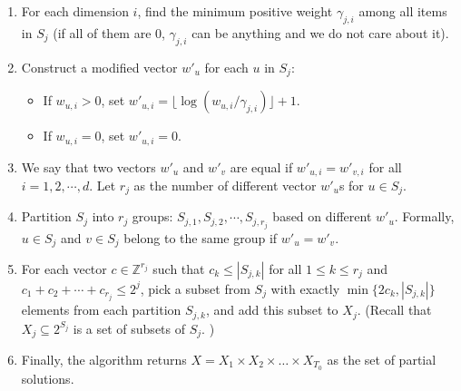\documentclass[11pt,a4paper]{article} \usepackage{enumitem}
\theoremstyle{definition}
\begin{document}
\begin{enumerate}
\item For each dimension \(i\), find the minimum positive weight \(\gamma_{j,i}\) among all items in \(S_j\) (if all of them are 0, \(\gamma_{j,i}\) can be anything and we do not care about it).

\item Construct a modified vector \(w'_u\) for each \(u\) in \(S_j\):
\begin{itemize}
    \item If \(w_{u,i} > 0\), set \(w'_{u,i} = \lfloor \log(w_{u,i}/\gamma_{j,i}) \rfloor + 1\).
    \item If \(w_{u,i} = 0\), set \(w'_{u,i} = 0\).
\end{itemize}

\item We say that two vectors \(w'_u\) and \(w'_v\) are equal if 
\(w'_{u,i} = w'_{v,i}\) for all \(i = 1, 2, \cdots, d\). 
Let \(r_j\) as the number of different vector \(w'_u\)s for $u\in S_j$.

\item Partition \(S_j\) into \(r_j\) groups: \(S_{j,1}, S_{j,2}, \cdots, S_{j,r_j}\) based on different \(w'_u\). Formally, 
$u\in S_j$ and $v\in S_j$ belong to the same group
if $w'_u = w'_v$.


\item For each vector \(c \in \mathbb{Z}^{r_j}\) such that \(c_k \le |S_{j,k}|\) for all \(1 \le k \le r_j\) and $c_1+c_2+\cdots+c_{r_j}\leq 2^j$, pick a subset from \(S_j\) with exactly \(\min \{2c_k, |S_{j,k}|\}\) elements from each partition \(S_{j,k}\), and add this subset to \(X_j\). (Recall that $X_j\subseteq 2^{S_j}$ is a set of subsets of $S_j$. )

\item Finally, the algorithm returns $X=X_1\times X_2\times \ldots\times X_{T_0}$ as the set of partial solutions.
\end{enumerate}
\end{document}
